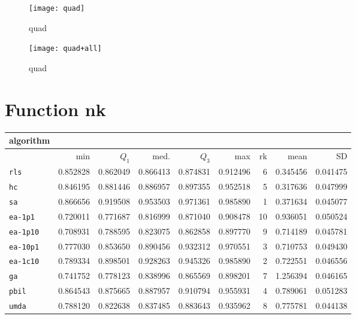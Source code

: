 \begin{center}
\begin{figure}[h]
\centering
\texttt{[image: quad]}
\caption{quad}
\end{figure}
\end{center}

\begin{center}
\begin{figure}[h]
\centering
\texttt{[image: quad+all]}
\caption{quad}
\end{figure}
\end{center}

\newpage

\section{Function nk}
\begin{center}
\begin{tabular}{@{}l*{5}{>{{}}N{1}{2}}>{{}}N{2}{0}N{1}{3}N{1}{3}@{}}
\toprule
{algorithm} &  &  \\
\midrule
& {min} & {$Q_1$} & {med.} & {$Q_3$} & {max} & {rk} & {mean} & {SD} \\
\midrule
\verb|rls| & 0.852828 & 0.862049 & 0.866413 & 0.874831 & 0.912496 & 6 & 0.345456 & 0.041475 \\
 \verb|hc| & 0.846195 & 0.881446 & 0.886957 & 0.897355 & 0.952518 & 5 & 0.317636 & 0.047999 \\
 \verb|sa| & {\color{blue}} 0.866656 & {\color{blue}} 0.919508 & {\color{blue}} 0.953503 & {\color{blue}} 0.971361 & {\color{blue}} 0.985890 & 1 & 0.371634 & 0.045077 \\
 \verb|ea-1p1| & 0.720011 & 0.771687 & 0.816999 & 0.871040 & 0.908478 & 10 & 0.936051 & 0.050524 \\
 \verb|ea-1p10| & 0.708931 & 0.788595 & 0.823075 & 0.862858 & 0.897770 & 9 & 0.714189 & 0.045781 \\
 \verb|ea-10p1| & 0.777030 & 0.853650 & 0.890456 & 0.932312 & 0.970551 & 3 & 0.710753 & 0.049430 \\
 \verb|ea-1c10| & 0.789334 & 0.898501 & 0.928263 & 0.945326 & {\color{blue}} 0.985890 & 2 & 0.722551 & 0.046556 \\
 \verb|ga| & 0.741752 & 0.778123 & 0.838996 & 0.865569 & 0.898201 & 7 & 1.256394 & 0.046165 \\
 \verb|pbil| & 0.864543 & 0.875665 & 0.887957 & 0.910794 & 0.955931 & 4 & 0.789061 & 0.051283 \\
 \verb|umda| & 0.788120 & 0.822638 & 0.837485 & 0.883643 & 0.935962 & 8 & 0.775781 & 0.044138 \\
 \bottomrule
\end{tabular}
\end{center}

